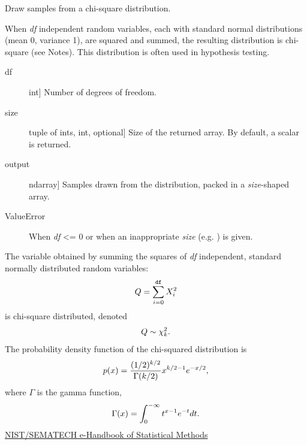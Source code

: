 \documentclass[letterpaper,10pt,english]{sphinxmanual}
\begin{document}
\begin{fulllineitems}
\label{pygeomod:pygeomod.geomodeller_xml_obj.chisquare}
Draw samples from a chi-square distribution.

When \emph{df} independent random variables, each with standard normal
distributions (mean 0, variance 1), are squared and summed, the
resulting distribution is chi-square (see Notes).  This distribution
is often used in hypothesis testing.
\begin{description}
\item[{df}] \leavevmode{[}int{]}
Number of degrees of freedom.

\item[{size}] \leavevmode{[}tuple of ints, int, optional{]}
Size of the returned array.  By default, a scalar is
returned.

\end{description}
\begin{description}
\item[{output}] \leavevmode{[}ndarray{]}
Samples drawn from the distribution, packed in a \emph{size}-shaped
array.

\end{description}
\begin{description}
\item[{ValueError}] \leavevmode
When \emph{df} \textless{}= 0 or when an inappropriate \emph{size} (e.g. )
is given.

\end{description}

The variable obtained by summing the squares of \emph{df} independent,
standard normally distributed random variables:
\begin{gather}
\begin{split}Q = \sum_{i=0}^{\mathtt{df}} X^2_i\end{split}\notag
\end{gather}
is chi-square distributed, denoted
\begin{gather}
\begin{split}Q \sim \chi^2_k.\end{split}\notag
\end{gather}
The probability density function of the chi-squared distribution is
\begin{gather}
\begin{split}p(x) = \frac{(1/2)^{k/2}}{\Gamma(k/2)}
x^{k/2 - 1} e^{-x/2},\end{split}\notag
\end{gather}
where \(\Gamma\) is the gamma function,
\begin{gather}
\begin{split}\Gamma(x) = \int_0^{-\infty} t^{x - 1} e^{-t} dt.\end{split}\notag
\end{gather}
\href{http://www.itl.nist.gov/div898/handbook/eda/section3/eda3666.htm}{NIST/SEMATECH e-Handbook of Statistical Methods}


\end{fulllineitems}
\end{document}
